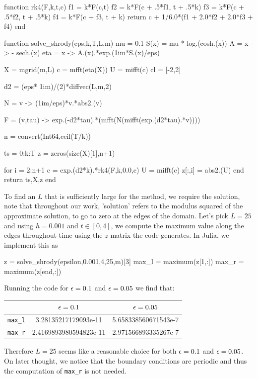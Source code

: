 \documentclass[12pt]{report}
\begin{document}
\begin{solution}
\begin{python}
function rk4(F,k,t,c)
    f1 = k*F(c,t)
    f2 = k*F(c + .5*f1, t + .5*k)
    f3 = k*F(c + .5*f2, t + .5*k)
    f4 = k*F(c + f3, t + k)
    return c + 1/6.0*(f1 + 2.0*f2 + 2.0*f3 + f4)
end

function solve_shrody(eps,k,T,L,m)
    mu = 0.1
    S(x) = mu * log.(cosh.(x))
    A = x -> - sech.(x)
    eta = x -> A.(x).*exp.(1im*S.(x)/eps)

    X = mgrid(m,L)
    c = mfft(eta(X))
    U = mifft(c)
    cl = [-2,2]

    d2 = (eps* 1im)/(2)*diffvec(L,m,2)

    N = v -> (1im/eps)*v.*abs2.(v)

    F = (v,tau) -> exp.(-d2*tau).*(mfft(N(mifft(exp.(d2*tau).*v))))


    n = convert(Int64,ceil(T/k))

    ts = 0:k:T
    z = zeros(size(X)[1],n+1)

    for i = 2:n+1
        c = exp.(d2*k).*rk4(F,k,0.0,c)
        U = mifft(c)
        z[:,i] = abs2.(U)
    end 
    return ts,X,z
end
    \end{python}

    \noindent
    To find an $L$ that is sufficiently large for the method, we require the solution, note that throughout our work, 'solution' refers to the modulus squared of the approximate solution, to go to zero at the edges of the domain. Let's pick $L=25$ and using $h=0.001$ and $t\in[0,4]$, we compute the maximum value along the edges throughout time using the $z$ matrix the code generates. In Julia, we implement this as
    \begin{python}
z = solve_shrody(epsilon,0.001,4,25,m)[3]
max_l = maximum(z[1,:])
max_r = maximum(z[end,:])
    \end{python}    
    Running the code for ${\epsilon} = 0.1$ and ${\epsilon}=0.05$ we find that:
    \begin{center}
        \begin{tabular}{ c|c|c }
          & ${\epsilon}=0.1$ & ${\epsilon}=0.05$ \\ 
         \hline
         \verb+max_l+ & 3.28135217179093e-11 & 5.658338560671543e-7 \\  
         \verb+max_r+ & 2.4169893980594823e-11 & 2.971566893335267e-7    
        \end{tabular}
    \end{center}
    Therefore $L=25$ seems like a reasonable choice for both ${\epsilon}=0.1$ and ${\epsilon}=0.05$. On later thought, we notice that the boundary conditions are periodic and thus the computation of \verb+max_r+ is not needed.



\end{solution}
\end{document}
